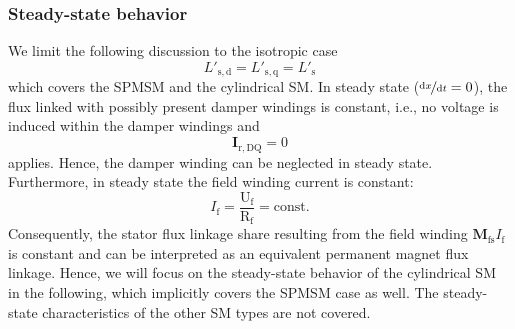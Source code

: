 \begin{frame}
	\frametitle{Steady-state behavior}
	We limit the following discussion to the isotropic case
	$$L'_\mathrm{s,d} =  L'_\mathrm{s,q} =L'_\mathrm{s}$$
	which covers the SPMSM and the cylindrical SM. \pause In steady state ($\nicefrac{\mathrm{d}x}{\mathrm{d}t} = 0$), the flux linked with possibly present damper windings is constant, i.e., no voltage is induced within the damper windings and
	$$\bm{I}_\mathrm{r,DQ} = 0$$
	applies. \pause Hence, the damper winding can be neglected in steady state. \pause Furthermore, in steady state the field winding current is constant:
	$$I_\mathrm{f} = \frac{\mathrm{U}_\mathrm{f} }{\mathrm{R}_\mathrm{f}} = \mathrm{const.}$$
	\pause
	Consequently, the stator flux linkage share resulting from the field winding $\bm{M}_\mathrm{fs} I_{\mathrm{f}}$ is constant and can be interpreted as an equivalent permanent magnet flux linkage. Hence, we will focus on the steady-state behavior of the cylindrical SM in the following, which implicitly covers the SPMSM case as well. The steady-state characteristics of the other SM types are not covered.
\end{frame}

